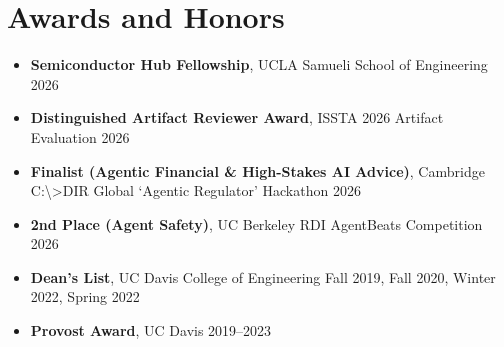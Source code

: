 \documentclass[letterpaper,10pt]{article}
\begin{document}
\section{Awards and Honors}
{\normalsize
\begin{itemize}[leftmargin=0.15in, label={}, itemsep=0pt]
  \item \textbf{Semiconductor Hub Fellowship}, UCLA Samueli School of Engineering \hfill 2026
  \item \textbf{Distinguished Artifact Reviewer Award}, ISSTA 2026 Artifact Evaluation \hfill 2026
  \item \textbf{Finalist (Agentic Financial \& High-Stakes AI Advice)}, Cambridge C:\textbackslash{}\textgreater{}DIR Global ‘Agentic Regulator’ Hackathon \hfill 2026
  \item \textbf{2nd Place (Agent Safety)}, UC Berkeley RDI AgentBeats Competition \hfill 2026
  \item \textbf{Dean's List}, UC Davis College of Engineering \hfill Fall 2019, Fall 2020, Winter 2022, Spring 2022
  \item \textbf{Provost Award}, UC Davis \hfill 2019--2023
\end{itemize}
}
\end{document}
